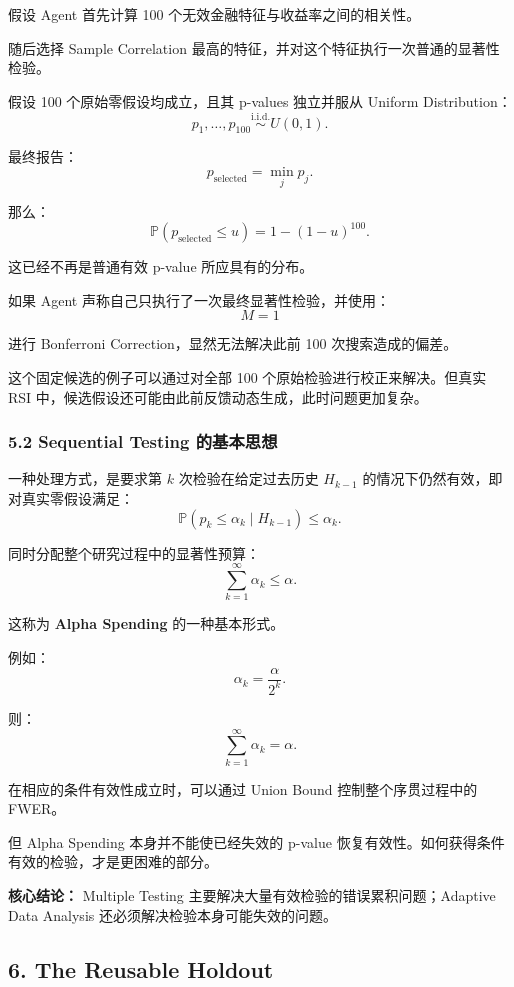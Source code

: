 假设 Agent 首先计算 100 个无效金融特征与收益率之间的相关性。

随后选择 Sample Correlation 最高的特征，并对这个特征执行一次普通的显著性检验。

假设 100 个原始零假设均成立，且其 p-values 独立并服从 Uniform Distribution：
\[p_1,\ldots,p_{100}
\overset{\mathrm{i.i.d.}}{\sim}U(0,1).\]

最终报告：
\[p_{\mathrm{selected}}=\min_j p_j.\]

那么：
\[\mathbb P(p_{\mathrm{selected}}\leq u)
=
1-(1-u)^{100}.\]

这已经不再是普通有效 p-value 所应具有的分布。

如果 Agent 声称自己只执行了一次最终显著性检验，并使用：
\[M=1\]

进行 Bonferroni Correction，显然无法解决此前 100 次搜索造成的偏差。

这个固定候选的例子可以通过对全部 100 个原始检验进行校正来解决。但真实 RSI 中，候选假设还可能由此前反馈动态生成，此时问题更加复杂。

\hypertarget{part-2-20-0001-sequential-testing-ux7684ux57faux672cux601dux60f3}{%
\subsubsection{5.2 Sequential Testing 的基本思想}\label{part-2-20-0001-sequential-testing-ux7684ux57faux672cux601dux60f3}}

一种处理方式，是要求第 \(k\) 次检验在给定过去历史 \(H_{k-1}\) 的情况下仍然有效，即对真实零假设满足：
\[\mathbb P
\left(
p_k\leq\alpha_k
\mid H_{k-1}
\right)
\leq\alpha_k.\]

同时分配整个研究过程中的显著性预算：
\[\sum_{k=1}^{\infty}\alpha_k\leq\alpha.\]

这称为 \textbf{Alpha Spending} 的一种基本形式。

例如：
\[\alpha_k=\frac{\alpha}{2^k}.\]

则：
\[\sum_{k=1}^{\infty}\alpha_k=\alpha.\]

在相应的条件有效性成立时，可以通过 Union Bound 控制整个序贯过程中的 FWER。

但 Alpha Spending 本身并不能使已经失效的 p-value 恢复有效性。如何获得条件有效的检验，才是更困难的部分。

\textbf{核心结论：} Multiple Testing 主要解决大量有效检验的错误累积问题；Adaptive Data Analysis 还必须解决检验本身可能失效的问题。

\hypertarget{part-2-20-0001-the-reusable-holdout}{%
\subsection{6. The Reusable Holdout}\label{part-2-20-0001-the-reusable-holdout}}

